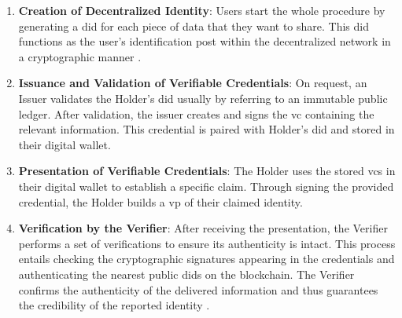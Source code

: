 \begin{enumerate}
  \item \textbf{Creation of Decentralized Identity}:
  Users start the whole procedure by generating a \gls{did} for each piece of data that they want to share. This \gls{did} functions as the user's identification post within the 
  decentralized network in a cryptographic manner \cite{ciscofpie}.
  \item \textbf{Issuance and Validation of Verifiable Credentials}:
  On request, an Issuer validates the Holder’s \gls{did} usually by referring to an immutable public ledger. After validation, the issuer creates and signs the \gls{vc} 
  containing the relevant information. This credential is paired with Holder's \gls{did} and stored in their digital wallet.
  \item \textbf{Presentation of Verifiable Credentials}:
  The Holder uses the stored \gls{vc}s in their digital wallet to establish a specific claim. Through signing the provided credential, the Holder builds a 
  \gls{vp} of their claimed identity.
  \item \textbf{Verification by the Verifier}:
  After receiving the presentation, the Verifier performs a set of verifications to ensure its authenticity is intact. This process entails checking the cryptographic 
  signatures appearing in the credentials and authenticating the nearest public \gls{did}s on the blockchain. The Verifier confirms the authenticity of the delivered information 
  and thus guarantees the credibility of the reported identity \cite{9869618}.
\end{enumerate}